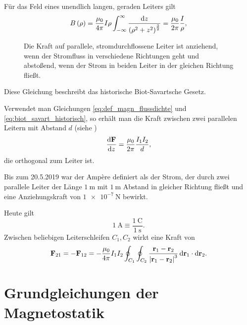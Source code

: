Für das Feld eines unendlich langen, geraden Leiters gilt
\begin{equation}
	\label{eq:biot_savart_historisch}
	B\left(\rho \right)=\frac{\mu _{0}}{4\pi }I\rho \int _{-\infty }^{\infty }\frac{\mathop{}\!\mathrm{d} z}{\left(\rho ^{2}+z^{2}\right)^{\frac{3}{2}}}=\frac{\mu _{0}}{2\pi }\frac{I}{\rho },
\end{equation}


\begin{figure}[htb]
	\centering
	\tfigKraftParalleleLeiter
	\caption{Die Kraft auf parallele, stromdurchflossene Leiter ist anziehend, wenn der Stromfluss in verschiedene Richtungen geht und abstoßend, wenn der Strom in beiden Leiter in der gleichen Richtung fließt. }
	\label{fig:force_parallel_conductors}
\end{figure}

Diese Gleichung beschreibt das historische Biot-Savartsche Gesetz.

Verwendet man Gleichungen \eqref{eq:def_magn_flussdichte} und \eqref{eq:biot_savart_historisch}, so erhält man die Kraft zwischen zwei parallelen Leitern mit Abstand $d$ (siehe )
\begin{equation*}
	\frac{\mathop{}\!\mathrm{d}\mathbf{F}}{\mathop{}\!\mathrm{d} z} = \frac{\mu_0}{2\pi} \frac{I_1I_2}d,
\end{equation*}
die orthogonal zum Leiter ist.

Bis zum 20.5.2019 war der Ampère definiert als der Strom, der durch zwei parallele Leiter der Länge $\SI{1}{\m}$ mit $\SI{1}{\m}$ Abstand in gleicher Richtung fließt und eine Anziehungskraft von $\SI{1e-7}{\newton}$ bewirkt.

Heute gilt
\begin{equation*}
	\SI{1}{\ampere}\equiv \frac{\SI{1}{\coulomb}}{\SI{1}{\s}}.
\end{equation*}
Zwischen beliebigen Leiterschleifen $C_{1},C_{2}$ wirkt eine Kraft von
\begin{equation*}
	\mathbf{F}_{21}=-\mathbf{F}_{12}=-\frac{\mu _{0}}{4\pi }I_{1}I_{2}\oint _{C_{1}}\oint _{C_{2}}\frac{\mathbf{r}_{1}-\mathbf{r}_{2}}{\left| \mathbf{r}_{1}-\mathbf{r}_{2}\right| ^{3}}\mathop{}\!\mathrm{d} \mathbf{r}_{1}\cdot \mathop{}\!\mathrm{d} \mathbf{r}_{2}.
\end{equation*}



\section{Grundgleichungen der Magnetostatik}


